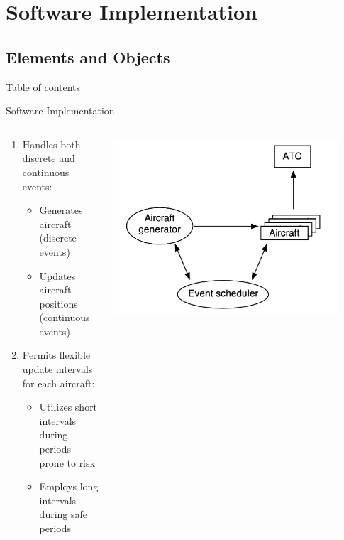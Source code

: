 \documentclass[UKenglish]{beamer}
\begin{document}
\section{Software Implementation}
\subsection{Elements and Objects}
\begin{frame}[allowframebreaks]{Table of contents}
    \tableofcontents[currentsection,hideothersubsections, subsubsectionstyle=show/show/show/hide]   
\end{frame}
\begin{frame}{Software Implementation}
\begin{columns}[T]
  \begin{column}{0.6\textwidth}
    \begin{enumerate}
        \item Handles both discrete and continuous events:
        \begin{itemize}
            \item Generates aircraft (discrete events)
            \item Updates aircraft positions (continuous events)
        \end{itemize}
        \item Permits flexible update intervals for each aircraft:
        \begin{itemize}
            \item Utilizes short intervals during periods prone to risk 
            \item Employs long intervals during safe periods
        \end{itemize}
    \end{enumerate}
\end{column}
    \begin{column}{0.5\textwidth}
        \includegraphics[width=0.9\textwidth]{MathDept-images/Structure.png}
    \end{column}
\end{columns}
\end{frame}
\end{document}

